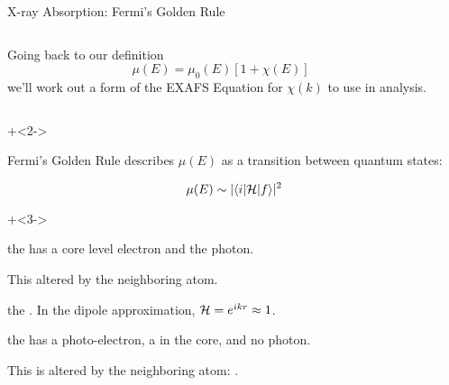 
\begin{slide}{X-ray Absorption: Fermi's Golden Rule}

    \vmm
    \begin{cenpage}{125mm}
      
    \begin{columns}
      \begin{column}{55mm}
        Going back to our definition
        \[   \mu(E) =   \mu_0(E) [1 + \chi(E)]     \]
        we'll work out a form of the EXAFS Equation
        for $\chi(k)$ to use    in      analysis.
      \end{column}
      \begin{column}{53mm}
      \end{column}
    \end{columns}

    \vmm
    \onslide+<2->

    Fermi's Golden Rule describes $\mu(E)$ as a transition between quantum
    states:

    \[  \mu(E) \sim | \langle i | {\cal{H}} | f \rangle |^2   \]

    \onslide+<3->

    \begin{description} \settowidth{\labelwidth}{5mm} \setlength{\itemindent}{-5mm}

    \item[{${\langle i |}$ \hspace{1mm}}] the {} has a
      core level electron and the photon. \par This {} altered by
      the neighboring atom.
    \item[{${\cal{H}}$ \hspace{1mm}}] the {}. In the
      dipole approximation, $ {{\cal{H}} = e^{ikr}} \approx 1$.
    \item[{${| f \rangle}$ \hspace{1mm}}] the {} has
      a photo-electron, a {} in the core, and no photon.  \par  This is
      altered by the neighboring atom: {}.
    \end{description}
  \end{cenpage}
\end{slide}
